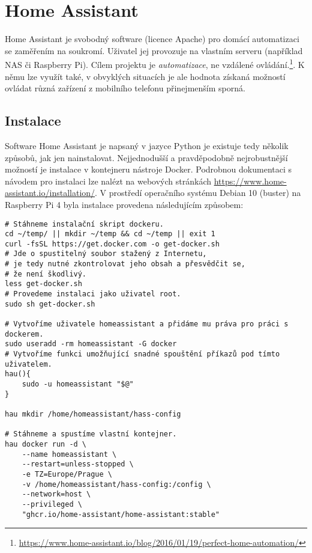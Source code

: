 \section{Home Assistant}
Home Assistant je svobodný software (licence Apache) pro domácí automatizaci se
zaměřením na soukromí. Uživatel jej provozuje na vlastním serveru (například
NAS či Raspberry Pi). Cílem projektu je \emph{automatizace}, ne vzdálené
ovládání.\footnote{\url{https://www.home-assistant.io/blog/2016/01/19/perfect-home-automation/}}.
K němu lze využít také, v obvyklých situacích je ale hodnota získaná možností
ovládat různá zařízení z mobilního telefonu přinejmenším sporná.

\subsection{Instalace}
Software Home Assistant je napsaný v jazyce Python je existuje tedy několik
způsobů, jak jen nainstalovat. Nejjednodušší a pravděpodobně nejrobustnější
možností je instalace v kontejneru nástroje Docker. Podrobnou dokumentaci
s návodem pro instalaci lze nalézt na webových stránkách
\url{https://www.home-assistant.io/installation/}.
V prostředí operačního systému Debian 10 (buster) na Raspberry Pi 4 byla
instalace provedena následujícím způsobem:
\begin{lstlisting}[language=mybash]
# Stáhneme instalační skript dockeru.
cd ~/temp/ || mkdir ~/temp && cd ~/temp || exit 1
curl -fsSL https://get.docker.com -o get-docker.sh
# Jde o spustitelný soubor stažený z Internetu,
# je tedy nutné zkontrolovat jeho obsah a přesvědčit se,
# že není škodlivý.
less get-docker.sh
# Provedeme instalaci jako uživatel root.
sudo sh get-docker.sh

# Vytvoříme uživatele homeassistant a přidáme mu práva pro práci s dockerem.
sudo useradd -rm homeassistant -G docker
# Vytvoříme funkci umožňující snadné spouštění příkazů pod tímto uživatelem.
hau(){
    sudo -u homeassistant "$@"
}

hau mkdir /home/homeassistant/hass-config

# Stáhneme a spustíme vlastní kontejner.
hau docker run -d \
    --name homeassistant \
    --restart=unless-stopped \
    -e TZ=Europe/Prague \
    -v /home/homeassistant/hass-config:/config \
    --network=host \
    --privileged \
    "ghcr.io/home-assistant/home-assistant:stable"
\end{lstlisting}

